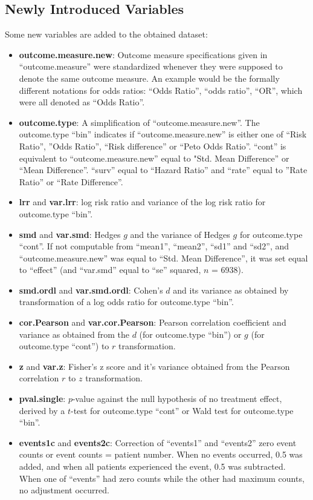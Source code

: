 \documentclass[11pt,a4paper,twoside]{book}\usepackage[]{graphicx}\usepackage[]{color}
\begin{document}
\subsection{Newly Introduced Variables}
Some new variables are added to the obtained dataset:
\begin{itemize}
\item \textbf{outcome.measure.new}: Outcome measure specifications given in ``outcome.measure'' were standardized whenever they were supposed to denote the same outcome measure. An example would be the formally different notations for odds ratios: ``Odds Ratio'', ``odds ratio'', ``OR'', which were all denoted as ``Odds Ratio''.
\item \textbf{outcome.type}: A simplification of ``outcome.measure.new''. The outcome.type ``bin'' indicates if ``outcome.measure.new'' is either one of ``Risk Ratio'', ''Odds Ratio'', ``Risk difference'' or ``Peto Odds Ratio''. ``cont'' is equivalent to ``outcome.measure.new'' equal to "Std. Mean Difference'' or ``Mean Difference''. ``surv'' equal to ``Hazard Ratio'' and ``rate'' equal to ''Rate Ratio'' or ``Rate Difference''.
\item \textbf{lrr} and \textbf{var.lrr}: log risk ratio and variance of the log risk ratio for outcome.type ``bin''.
\item \textbf{smd} and \textbf{var.smd}: Hedges $g$ and the variance of Hedges $g$ for outcome.type ``cont''. If not computable from ``mean1'', ``mean2'', ``sd1'' and ``sd2'', and ``outcome.measure.new'' was equal to ``Std. Mean Difference'', it was set equal to ``effect'' (and ``var.smd'' equal to ``se'' squared, $n$ =  6938).
\item \textbf{smd.ordl} and \textbf{var.smd.ordl}: Cohen's $d$ and its variance as obtained by transformation of a log odds ratio for outcome.type ``bin''.
\item \textbf{cor.Pearson} and \textbf{var.cor.Pearson}: Pearson correlation coefficient and variance as obtained from the $d$ (for outcome.type ``bin'') or $g$ (for outcome.type ``cont'') to $r$ transformation.
\item \textbf{z} and \textbf{var.z}: Fisher's z score and it's variance obtained from the Pearson correlation $r$ to $z$ transformation.
\item \textbf{pval.single}: $p$-value against the null hypothesis of no treatment effect, derived by a $t$-test for outcome.type ``cont'' or Wald test for outcome.type ``bin''.
\item \textbf{events1c} and \textbf{events2c}: Correction of ``events1'' and ``events2'' zero event counts or event counts = patient number. When no events occurred, 0.5 was added, and when all patients experienced the event, 0.5 was subtracted. When one of ``events'' had zero counts while the other had maximum counts, no adjustment occurred.

\end{itemize}
\end{document}
